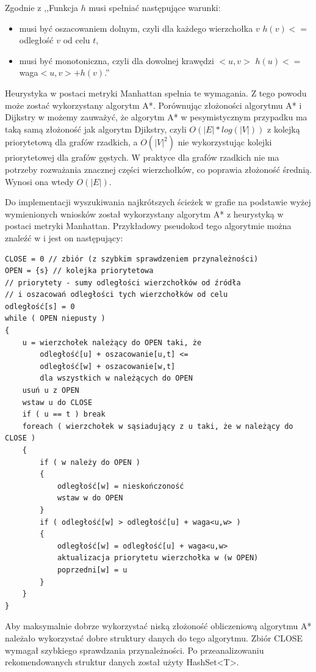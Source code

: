 \documentclass[a4paper,11pt,twoside,openright]{report}
\theoremstyle{definition}
\begin{document}
Zgodnie z \cite{AiSD2} ,,Funkcja $h$ musi spełniać następujące warunki:

\begin{itemize}[noitemsep]
\item musi być oszacowaniem dolnym, czyli dla każdego wierzchołka $v$ $h(v) <=$ odległość $v$ od celu $t$,
\item musi być monotoniczna, czyli dla dowolnej krawędzi $<u,v>$ $h(u) <= $waga$<u,v> + h(v)$.''
\end{itemize}

Heurystyka w postaci metryki Manhattan spełnia te wymagania. Z tego powodu może
zostać wykorzystany algorytm A*. Porównując złożoności algorytmu A* i Dijkstry w
\cite{AiSD2} możemy zauważyć, że algorytm A* w pesymistycznym przypadku ma taką
samą złożoność jak algorytm Djikstry, czyli $O(|E|*log(|V|))$ z kolejką priorytetową
dla grafów rzadkich, a $O(|V|^2)$ nie wykorzystując kolejki priorytetowej dla
grafów gęstych. W praktyce dla grafów rzadkich nie ma potrzeby rozważania znacznej
części wierzchołków, co poprawia złożoność średnią. Wynosi ona wtedy $O(|E|)$.

Do implementacji wyszukiwania najkrótszych ścieżek w grafie na podstawie wyżej
wymienionych wniosków został wykorzystany algorytm A* z heurystyką w postaci
metryki Manhattan. Przykładowy pseudokod tego algorytmie można znaleźć w
\cite{AiSD2} i jest on następujący: %

\begin{verbatim}
CLOSE = 0 // zbiór (z szybkim sprawdzeniem przynależności)
OPEN = {s} // kolejka priorytetowa
// priorytety - sumy odległości wierzchołków od źródła
// i oszacowań odległości tych wierzchołków od celu
odległość[s] = 0
while ( OPEN niepusty )
{
    u = wierzchołek należący do OPEN taki, że
        odległość[u] + oszacowanie[u,t] <=
        odległość[w] + oszacowanie[w,t]
        dla wszystkich w należących do OPEN
    usuń u z OPEN
    wstaw u do CLOSE
    if ( u == t ) break
    foreach ( wierzchołek w sąsiadujący z u taki, że w należący do CLOSE )
    {
        if ( w należy do OPEN )
        {
            odległość[w] = nieskończoność
            wstaw w do OPEN
        }
        if ( odległość[w] > odległość[u] + waga<u,w> )
        {
            odległość[w] = odległość[u] + waga<u,w>
            aktualizacja priorytetu wierzchołka w (w OPEN)
            poprzedni[w] = u
        }
    }
}
\end{verbatim}

Aby maksymalnie dobrze wykorzystać niską złożoność obliczeniową algorytmu A*
należało wykorzystać dobre struktury danych do tego algorytmu. Zbiór CLOSE
wymagał szybkiego sprawdzania przynależności. Po przeanalizowaniu rekomendowanych
struktur danych \cite{Dotnet struktury} został użyty HashSet<T>.
\end{document}
